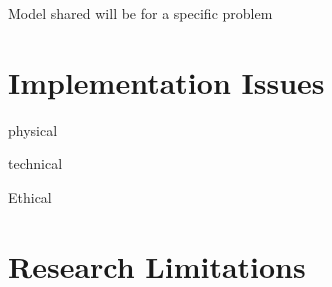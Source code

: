 Model shared will be for a specific problem 

\section{Implementation Issues}

physical

technical

Ethical


\section{Research Limitations}
